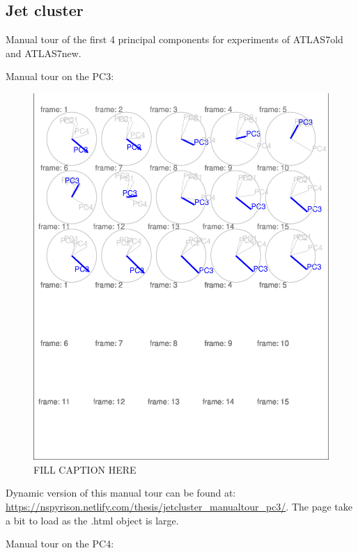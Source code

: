 \documentclass{monashthesis}
\begin{document}
\subsection{Jet cluster}\label{jet-cluster}

Manual tour of the first 4 principal components for experiments of
ATLAS7old and ATLAS7new.

Manual tour on the PC3:

\begin{figure}
\centering
\includegraphics{thesis_files/figure-latex/JetClusterGood-1.pdf}
\caption{\label{fig:JetClusterGood}FILL CAPTION HERE}
\end{figure}

Dynamic version of this manual tour can be found at:
\url{https://nspyrison.netlify.com/thesis/jetcluster_manualtour_pc3/}.
The page take a bit to load as the .html object is large.

Manual tour on the PC4:
\end{document}

